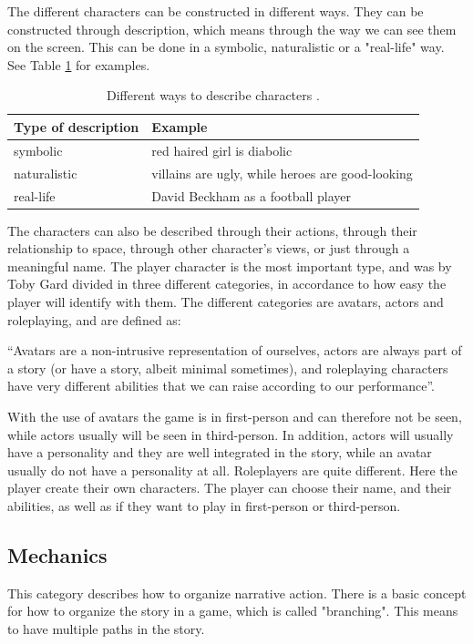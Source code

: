 The different characters can be constructed in different ways. They can be constructed through description, which means through the way we can see them on the screen. This can be done in a symbolic, naturalistic or a "real-life" way. See Table \ref{tab:description} for examples.

\begin{table}
\centering
    \begin{tabular}{|l|l|}
        \hline
        \textbf{Type of description} & \textbf{Example} \\ \hline
       symbolic & red haired girl is diabolic  \\ \hline
       naturalistic & villains are ugly, while heroes are good-looking \\ \hline
       real-life & David Beckham as a football player \\ \hline
    \end{tabular}
    \caption[Different ways to describe characters]{Different ways to describe characters \cite{understandingvg}.}
    \label{tab:description}
\end{table} 

The characters can also be described through their actions, through their relationship to space, through other character’s views, or just through a meaningful name. The player character is the most important type, and was by Toby Gard divided in three different categories, in accordance to how easy the player will identify with them. The different categories are avatars, actors and roleplaying, and are defined as:

“Avatars are a non-intrusive representation of ourselves, actors are always part of a story (or have a story, albeit minimal sometimes), and roleplaying characters have very different abilities that we can raise according to our performance”. \cite{understandingvg} 

With the use of avatars the game is in first-person and can therefore not be seen, while actors usually will be seen in third-person. In addition, actors will usually have a personality and they are well integrated in the story, while an avatar usually do not have a personality at all. Roleplayers are quite different. Here the player create their own characters. The player can choose their name, and their abilities, as well as if they want to play in first-person or third-person.  

\subsection{Mechanics}
This category describes how to organize narrative action. There is a basic concept for how to organize the story in a game, which is called "branching". This means to have multiple paths in the story. 


